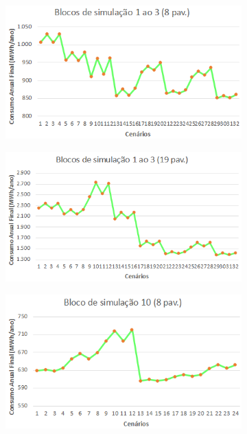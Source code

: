 \begin{figure}[H]
    \centering
    \caption{Gráfico dos blocos de simulação das variáveis de vidro, orientação solar e do sistemas de condicionamento de ar e medidas de redução de carga dos modelos genérico de 8 (esq.) e 19 pavimentos (dir.)}
    \begin{subfigure}[b]{0.49\textwidth}
        \includegraphics[width=\textwidth]{figures/result/fig25-bloco1-3.png}
    \end{subfigure}
    \begin{subfigure}[b]{0.49\textwidth}
        \includegraphics[width=\textwidth]{figures/result/fig26-bloco1-3.png}
    \end{subfigure}
    \begin{subfigure}[b]{0.49\textwidth}
        \includegraphics[width=\textwidth]{figures/result/fig27-bloco10.png}

\end{subfigure}
\end{figure}
